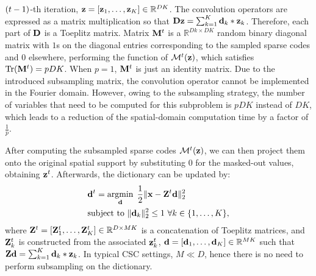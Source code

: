 $(t-1)$-th iteration, $\code = [\code_1, \dots, \code_K] \in
\mathbb{R}^{DK}$. The convolution operators are expressed as a matrix
multiplication so that $ \Filter \code = \sum_{k=1}^{K} \filter_k *
\code_k$. Therefore, each part of $\Filter$ is a Toeplitz
matrix. Matrix $\mask^{\ite}$ is a $\mathbb{R}^{Dk \times DK}$ random binary
diagonal matrix with $1$s on the diagonal entries corresponding to the sampled
sparse codes and $0$ elsewhere, performing the function of
$\mathcal{M}^{\ite}(\code)$, which satisfies $\mathrm{Tr}(\mask^{\ite}) = pDK$. When $p=1$, $\mask^{\ite}$ is just an identity matrix.
Due to the introduced subsampling matrix, the
convolution operator cannot be implemented in the Fourier
domain. However, owing to the subsampling
strategy, the number of variables that need to be computed for this
subproblem is $pDK$ instead of $DK$, which leads to a reduction
of the spatial-domain computation time by a factor of $\frac{1}{p}$.

After computing the subsampled sparse codes $\mathcal{M}^{\ite}(\code)$, we can then project them
onto the original spatial support by substituting $0$ for the
masked-out values, obtaining $\code^{\ite}$. Afterwards, the dictionary can be updated by:
\begin{equation} \label{eq:updatingFilter}
\begin{split}
   & \filter^{\ite} = \minimize{\filter} \frac{1}{2}\|\signal - \Code^{\ite} \filter \|_2^2 \\
   & \text{subject to}  ~ \|\filter_k\|^2_2 \leq 1 ~ \forall k \in \{1,\dots,K\},
\end{split}
\end{equation}
where $\Code^{\ite}= [\Code_1^{\ite}, \dots, \Code_K^{\ite}]
\in \mathbb{R}^{D \times MK}$ is a concatenation of Toeplitz matrices,
and $\Code_k^{\ite}$ is constructed from the associated $\code_k^{\ite}$, $\filter=
[\filter_1,\dots,\filter_K] \in \mathbb{R}^{MK}$ such that $ \Code
\filter = \sum_{k=1}^{K} \filter_k * \code_k$. In typical CSC
settings, $M \ll D$, hence there is no need to perform subsampling on
the dictionary.

